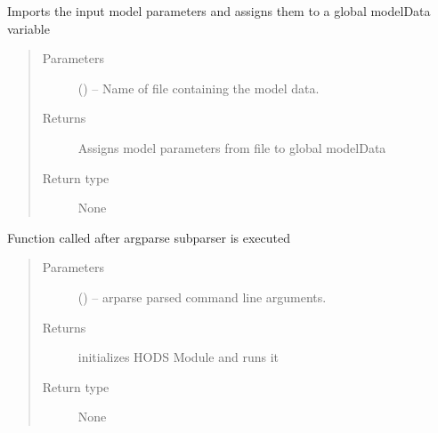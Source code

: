 \documentclass[letterpaper,10pt,english]{sphinxmanual}
\begin{document}

\begin{fulllineitems}
\label{\detokenize{MouseReferenceManual:Modules.Module_HODS.importModelData}}
Imports the input model parameters and assigns them to a global modelData variable
\begin{quote}\begin{description}
\item[{Parameters}] \leavevmode
{} () -- Name of file containing the model data.

\item[{Returns}] \leavevmode
Assigns model parameters from file to global modelData

\item[{Return type}] \leavevmode
None

\end{description}\end{quote}

\end{fulllineitems}


\begin{fulllineitems}
\label{\detokenize{MouseReferenceManual:Modules.Module_HODS.parserHandler}}
Function called after argparse subparser is executed
\begin{quote}\begin{description}
\item[{Parameters}] \leavevmode
{} () -- arparse parsed command line arguments.

\item[{Returns}] \leavevmode
initializes HODS Module and runs it

\item[{Return type}] \leavevmode
None

\end{description}\end{quote}

\end{fulllineitems}

\end{document}
